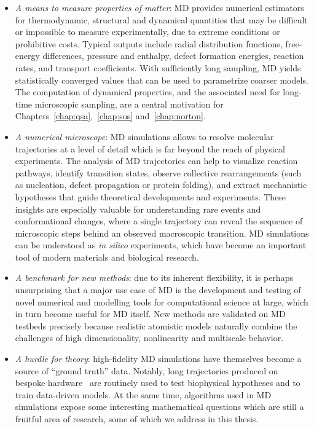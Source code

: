 \begin{itemize}
\item \textit{A means to measure properties of matter}: MD provides numerical estimators for thermodynamic, structural and dynamical quantities that may be difficult or impossible to measure experimentally, due to extreme conditions or prohibitive costs. Typical outputs include radial distribution functions, free-energy differences, pressure and enthalpy, defect formation energies, reaction rates, and transport coefficients. With sufficiently long sampling, MD yields statistically converged values that can be used to parametrize coarser models. The computation of dynamical properties, and the associated need for long-time microscopic sampling, are a central motivation for Chapters~\ref{chap:qsa},~\ref{chap:sos} and~\ref{chap:norton}.
  \item \textit{A numerical microscope}: MD simulations allows to resolve molecular trajectories at a level of detail which is far beyond the reach of physical experiments. The analysis of MD trajectories can help to visualize reaction pathways, identify transition states, observe collective rearrangements (such as nucleation, defect propagation or protein folding), and extract mechanistic hypotheses that guide theoretical developments and experiments. These insights are especially valuable for understanding rare events and conformational changes, where a single trajectory can reveal the sequence of microscopic steps behind an observed macroscopic transition. MD simulations can be understood as \textit{in silico} experiments, which have become an important tool of modern materials and biological research.
  \item \textit{A benchmark for new methods}: due to its inherent flexibility, it is perhaps unsurprising that a major use case of MD is the development and testing of novel numerical and modelling tools for computational science at large, which in turn become useful for MD itself. New methods are validated on MD testbeds precisely because realistic atomistic models naturally combine the challenges of high dimensionality, nonlinearity and multiscale behavior.
  \item \textit{A hurdle for theory}: high-fidelity MD simulations have themselves become a source of ``ground truth'' data. Notably, long trajectories produced on bespoke hardware~\cite{SDDKLSYBBCal08} are routinely used to test biophysical hypotheses and to train data-driven models. At the same time, algorithms used in MD simulations expose some interesting mathematical questions which are still a fruitful area of research, some of which we address in this thesis.
\end{itemize}

